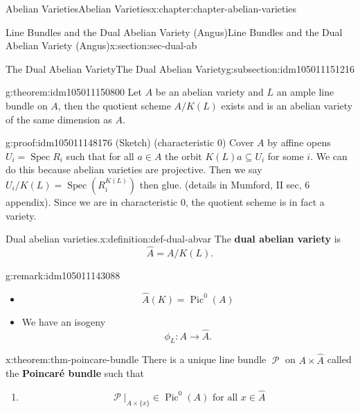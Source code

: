 \documentclass[oneside,10pt,]{book}
\newcommand{\terminology}[1]{\textbf{#1}}
\numberwithin{equation}{section}
\newcommand{\sheaf}[1]{\operatorname{\mathcal{#1}}}
\DeclareMathOperator{\Pic}{Pic}
\DeclareMathOperator{\Spec}{Spec}
\begin{document}
\begin{chapterptx}{Abelian Varieties}{}{Abelian Varieties}{}{}{x:chapter:chapter-abelian-varieties}
\begin{sectionptx}{Line Bundles and the Dual Abelian Variety (Angus)}{}{Line Bundles and the Dual Abelian Variety (Angus)}{}{}{x:section:sec-dual-ab}
\typeout{************************************************}
%
\begin{subsectionptx}{The Dual Abelian Variety}{}{The Dual Abelian Variety}{}{}{g:subsection:idm105011151216}
\begin{theorem}{}{}{g:theorem:idm105011150800}%
Let \(A\) be an abelian variety and \(L\) an ample line bundle on \(A\), then the quotient scheme \(A/K(L)\) exists and is an abelian variety of the same dimension as \(A\).%
\end{theorem}
\begin{proofptx}{}{g:proof:idm105011148176}
(Sketch) (characteristic 0) Cover \(A\) by affine opens \(U_i = \Spec R_i\) such that for all \(a \in A\) the orbit \(K(L)a \subseteq U_i\) for some \(i\). We can do this because abelian varieties are projective. Then we say \(U_i / K(L) = \Spec(R^{K(L)}_i)\) then glue. (details in Mumford, II sec, 6  appendix). Since we are in characteristic 0, the quotient scheme is in fact a variety.%
\end{proofptx}
\begin{definition}{Dual abelian varieties.}{x:definition:def-dual-abvar}%
The \terminology{dual abelian variety} is%
\begin{equation*}
\hat A = A/K(L)\text{.}
\end{equation*}
%
\end{definition}
\begin{remark}{}{g:remark:idm105011143088}%
%
\begin{itemize}[label=\textbullet]
\item{}%
\begin{equation*}
\hat A(K) = \Pic^0(A)
\end{equation*}
%
\item{}We have an isogeny%
\begin{equation*}
\phi_L\colon A \to \hat A\text{.}
\end{equation*}
%
\end{itemize}
%
\end{remark}
\begin{theorem}{}{}{x:theorem:thm-poincare-bundle}%
There is a unique line bundle \(\sheaf P\) on \(A\times \hat A\) called the \terminology{Poincaré bundle} such that%
\begin{enumerate}
\item{}%
\begin{equation*}
\sheaf P|_{A\times \{x\}} \in \Pic^0(A) \text{ for all }x\in \hat A
\end{equation*}

\end{enumerate}
\end{theorem}
\end{subsectionptx}
\end{sectionptx}
\end{chapterptx}
\end{document}
